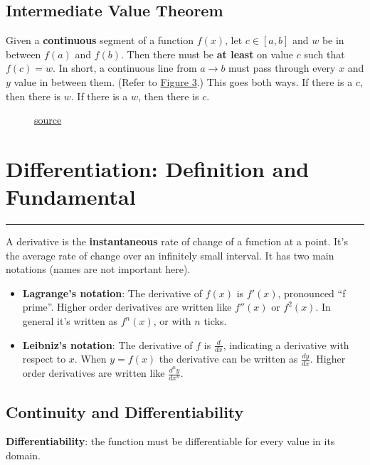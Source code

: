 \documentclass[12pt]{article}
\newcommand{\fline}{\par\noindent\rule{\textwidth}{0.1pt}} %
\begin{document}
\subsection{Intermediate Value Theorem}
Given a \textbf{continuous} segment of a function $f(x)$, let $c \in [a, b]$ and $w$ be in between $f(a)$ and $f(b)$. Then there must be \textbf{at least} on value $c$ such that $f(c) = w$. In short, a continuous line from $a \to b$ must pass through every $x$ and $y$ value in between them. (Refer to \hyperref[fig:intvaltheorem]{Figure 3}.) This goes both ways. If there is a $c$, then there is  $w$. If there is a $w$, then there is $c$.

\begin{figure}[H]
    \begin{center}
        \caption{\href{https://www.mathsisfun.com/algebra/intermediate-value-theorem.html}{source}}
        \label{fig:intvaltheorem}
    \end{center}
\end{figure}

\section[Differentiation: Definition and Fundamental Properties]{Differentiation: Definition and Fundamental}
\fline

A derivative is the \textbf{instantaneous} rate of change of a function at a point. It's the average rate of change over an infinitely small interval. It has two main notations (names are not important here).
\begin{itemize} %
    \item \textbf{Lagrange's notation}:
          The derivative of $f(x)$ is $f'(x)$, pronounced ``f prime''. Higher order derivatives are written like $f''(x)$ or $f^2(x)$. In general it's written as $f^{n}(x)$, or with $n$ ticks.
    \item \textbf{Leibniz's notation}:
          The derivative of $f$ is $\frac{d}{dx}$, indicating a derivative with respect to $x$. When $y=f(x)$ the derivative can be written as $\frac{dy}{dx}$. Higher order derivatives are written like $\frac{d^{n}y}{dx^{n}}$.
\end{itemize}

\subsection{Continuity and Differentiability}
\noindent \textbf{Differentiability}: the function must be differentiable for every value in its domain.
\end{document}
